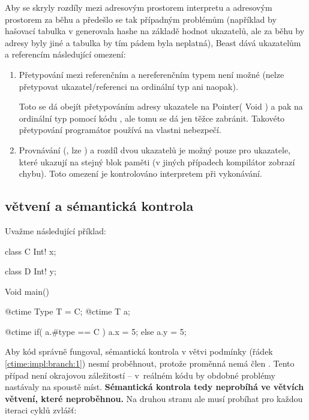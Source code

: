 Aby se skryly rozdíly mezi adresovým prostorem interpretu a adresovým prostorem za běhu a předešlo se tak případným problémům (například by hašovací tabulka v \ctime generovala hashe na základě hodnot ukazatelů, ale za běhu by adresy byly jiné a tabulka by tím pádem byla neplatná), Beast dává \ctime ukazatelům a referencím následující omezení:
\begin{enumerate}
	\item Přetypování mezi referenčním a nereferenčním typem není možné (nelze přetypovat ukazatel/referenci na ordinální typ ani naopak).
	
	Toto se dá obejít přetypováním adresy ukazatele na Pointer( Void ) a pak na ordinální typ pomocí kódu , ale tomu se dá jen těžce zabránit. Takovéto přetypování programátor používá na vlastni nebezpečí.
	
	\item Provnávání (\inlineCode{< > <= >=}, lze ) a rozdíl dvou ukazatelů je možný pouze pro ukazatele, které ukazují na stejný blok paměti (v jiných případech kompilátor zobrazí chybu). Toto omezení je kontrolováno interpretem při vykonávání.
\end{enumerate}

\subsection{\ctime větvení a sémantická kontrola}

Uvažme následující příklad:

\begin{code}
class C {
	Int! x;
}

class D {
	Int! y;
}
	
Void main() {
	@ctime Type T = C;
	@ctime T a;
	
	@ctime if( a.#type == C )
		a.x = 5;
	else
		a.y = 5; $\label{ctime:impl:branch:1}$
}
\end{code}

Aby kód správně fungoval, sémantická kontrola v  větvi podmínky (řádek \ref{ctime:impl:branch:1}) nesmí proběhnout, protože proměnná  nemá člen . Tento případ není okrajovou záležitostí -- v~reálném \ctime kódu by obdobné problémy nastávaly na spoustě míst. \textbf{Sémantická kontrola tedy neprobíhá ve větvích \ctime větvení, které neproběhnou.} Na druhou stranu ale musí probíhat pro každou iteraci \ctime cyklů zvlášť: \nopagebreak

